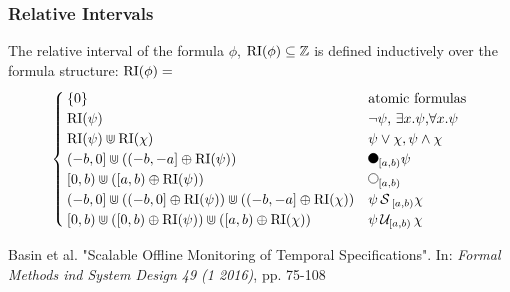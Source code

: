 \begin{frame}
    \frametitle{Relative Intervals}
    \begin{definition} 
        \label{def:rel-int}
        The relative interval of the formula $\phi$, $\operatorname{RI}(\phi) \subseteq \mathbb{Z}$ is defined inductively over the formula structure: 
        $\operatorname{RI}(\phi) =$
        \begin{equation*}
            \begin{cases}
                \{0\}     & \text{atomic formulas} \\ 
                \RI(\psi) & \text{$\neg \psi$, 
                                    $\exists x.\psi$,} \forall x.\psi \\
                \RI(\psi) \Cup \RI(\chi) & \text{$\psi \lor \chi, 
                                                \psi \land \chi$} \\
                (-b,0] \Cup ((-b,-a] \oplus \RI(\psi)) & \text{$\Previous{[a,b)}\psi$} \\
                [0,b) \Cup ([a,b) \oplus \RI(\psi)) & \text{$\Next{[a,b)}$}\\
                (-b,0] \Cup ((-b,0] \oplus \RI(\psi)) \Cup ((-b,-a] \oplus \RI(\chi)) & \text{$\psi \Since{}_{[a,b)} \chi$} \\
                [0,b) \Cup ([0,b) \oplus \RI(\psi)) \Cup ([a,b) \oplus \RI(\chi)) & \text{$\psi \Until{[a,b)} \chi$} \\
            \end{cases}
        \end{equation*}
    \end{definition}
    {\footnotesize
    Basin et al. "Scalable Offline Monitoring of Temporal Specifications". In: \textit{Formal Methods ind System Design 49 (1 2016)}, pp. 75-108
    }
\end{frame}



